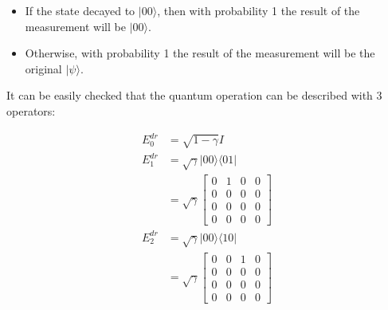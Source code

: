\documentclass[10pt]{article}
\begin{document}
\begin{itemize}
  \item If the state decayed to $|00\rangle$, then with probability 1 the result of the measurement will be $|00\rangle$.
  \item Otherwise, with probability 1 the result of the measurement will be the original $|\psi\rangle$.
\end{itemize}

It can be easily checked that the quantum operation can be described with 3 operators:

$$
  \begin{aligned}
    E_{0}^{d r} & =\sqrt{1-\gamma} I                     \\
    E_{1}^{d r} & =\sqrt{\gamma}|00\rangle\langle 01|    \\
                & =\sqrt{\gamma}\left[\begin{array}{llll}
                                          0 & 1 & 0 & 0 \\
                                          0 & 0 & 0 & 0 \\
                                          0 & 0 & 0 & 0 \\
                                          0 & 0 & 0 & 0
                                        \end{array}\right] \\
    E_{2}^{d r} & =\sqrt{\gamma}|00\rangle\langle 10|    \\
                & =\sqrt{\gamma}\left[\begin{array}{llll}
                                          0 & 0 & 1 & 0 \\
                                          0 & 0 & 0 & 0 \\
                                          0 & 0 & 0 & 0 \\
                                          0 & 0 & 0 & 0
                                        \end{array}\right]
  \end{aligned}
$$
\end{document}
